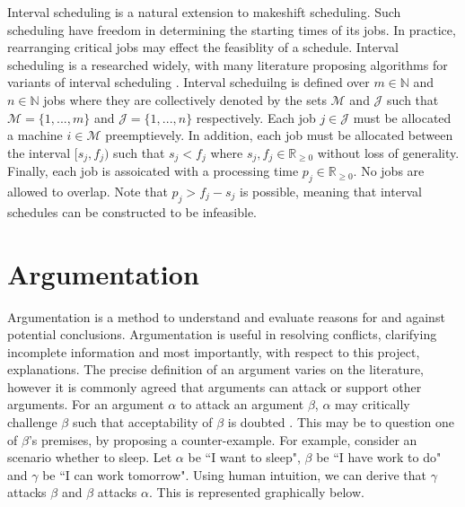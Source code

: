 Interval scheduling is a natural extension to makeshift scheduling. Such scheduling have freedom in determining the starting times of its jobs. In practice, rearranging critical jobs may effect the feasiblity of a schedule. Interval scheduling is a researched widely, with many literature proposing algorithms for variants of interval scheduling \cite{is}.
\linespace
Interval scheduilng is defined over $m\in\mathbb{N}$ and $n\in\mathbb{N}$ jobs where they are collectively denoted by the sets $\mathcal{M}$ and $\mathcal{J}$ such that $\mathcal{M}=\{1,...,m\}$ and $\mathcal{J}=\{1,...,n\}$ respectively. Each job $j\in\mathcal{J}$ must be allocated a machine $i\in\mathcal{M}$ preemptievely. In addition, each job must be allocated between the interval $[s_j,f_j)$ such that $s_j<f_j$ where $s_j,f_j\in\mathbb{R}_{\geq 0}$ without loss of generality. Finally, each job is assoicated with a processing time $p_j\in\mathbb{R}_{\geq 0}$. No jobs are allowed to overlap. Note that $p_j>f_j-s_j$ is possible, meaning that interval schedules can be constructed to be infeasible.

\section{Argumentation}

Argumentation is a method to understand and evaluate reasons for and against potential conclusions. Argumentation is useful in resolving conflicts, clarifying incomplete information and most importantly, with respect to this project, explanations. The precise definition of an argument varies on the literature, however it is commonly agreed that arguments can attack or support other arguments. For an argument $\alpha$ to attack an argument $\beta$, $\alpha$ may critically challenge $\beta$ such that acceptability of $\beta$ is doubted \cite{at}. This may be to question one of $\beta$'s premises, by proposing a counter-example. For example, consider an scenario whether to sleep. Let $\alpha$ be ``I want to sleep", $\beta$ be ``I have work to do" and $\gamma$ be ``I can work tomorrow". Using human intuition, we can derive that $\gamma$ attacks $\beta$ and $\beta$ attacks $\alpha$. This is represented graphically below.

\begin{center}
\end{center}

